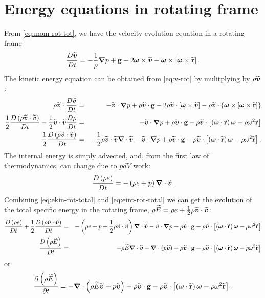 \section{Energy equations in rotating frame}
From \ref{eq:mom-rot-tot}, we have the velocity evolution equation in
a rotating frame
  \begin{equation}\label{eq:v-rot}
    \frac{D\vbt}{Dt} = -\frac{1}{\rho}\nablab p + \gb - 2\ob\times\vbt - \ob\times\left[\ob\times\rbt\right].
  \end{equation}
The kinetic energy equation can be obtained from \ref{eq:v-rot} by
mulitplying by \(\rho\vbt\):
  \begin{eqnarray}
    \rho\vbt\cdot\frac{D\vbt}{Dt} &=& -\vbt\cdot\nablab p + \rho\vbt\cdot\gb - 2\rho\vbt\cdot\left[\ob\times\vbt\right] - \rho\vbt\cdot\left\{\ob\times\left[\ob\times\rbt\right]\right\} \nonumber \\
    \frac{1}{2}\frac{D\left(\rho\vbt\cdot\vbt\right)}{Dt} - \frac{1}{2}\vbt\cdot\vbt\frac{D\rho}{Dt} &=& -\vbt\cdot\nablab p + \rho\vbt\cdot\gb - \rho\vbt\cdot\left[\left(\ob\cdot\rbt\right)\ob - \rho\omega^2\rbt\right] \nonumber \\
    \frac{1}{2}\frac{D\left(\rho\vbt\cdot\vbt\right)}{Dt} &=& -\frac{1}{2}\rho\vbt\cdot\vbt\nablab\cdot\vbt - \vbt\cdot\nablab p + \rho\vbt\cdot\gb - \rho\vbt\cdot\left[\left(\ob\cdot\rbt\right)\ob - \rho\omega^2\rbt\right]. \label{eq:ekin-rot-total}
  \end{eqnarray}
The internal energy is simply advected, and, from the first law of
thermodynamics, can change due to \(pdV\) work:
  \begin{equation}\label{eq:eint-rot-total}
    \frac{D\left(\rho e\right)}{Dt} = -\left(\rho e + p\right)\nablab\cdot\vbt.
  \end{equation}
Combining \ref{eq:ekin-rot-total} and \ref{eq:eint-rot-total} we can
get the evolution of the total specific energy in the rotating frame,
\(\rho \widetilde{E} = \rho e + \frac{1}{2}\rho\vbt\cdot\vbt\): 
  \begin{eqnarray}
    \frac{D\left(\rho e\right)}{Dt} + \frac{1}{2}\frac{D\left(\rho\vbt\cdot\vbt\right)}{Dt} &=& -\left(\rho e + p + \frac{1}{2}\rho\vbt\cdot\vbt\right)\nablab\cdot\vbt - \vbt\cdot\nablab p + \rho\vbt\cdot\gb -\rho\vbt\cdot\left[\left(\ob\cdot\rbt\right)\ob - \rho\omega^2\rbt\right]\nonumber \\
    \frac{D\left(\rho \widetilde{E}\right)}{Dt} &=& -\rho\widetilde{E}\nablab\cdot\vbt - \nablab\cdot\left(p\vbt\right) + \rho\vbt\cdot\gb - \rho\vbt\cdot\left[\left(\ob\cdot\rbt\right)\ob - \rho\omega^2\rbt\right] \label{eq:etot-rot-total}
  \end{eqnarray}
or
  \begin{equation}\label{eq:etot-rot}
    \frac{\partial\left(\rho\widetilde{E}\right)}{\partial t} = -\nablab\cdot\left(\rho\widetilde{E}\vbt + p\vbt\right) + \rho\vbt\cdot\gb - \rho\vbt\cdot\left[\left(\ob\cdot\rbt\right)\ob - \rho\omega^2\rbt\right].
  \end{equation}

